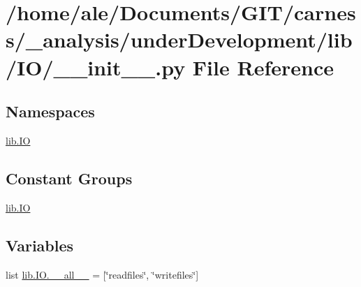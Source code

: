 \hypertarget{a00046}{\section{/home/ale/\-Documents/\-G\-I\-T/carness/\-\_\-analysis/under\-Development/lib/\-I\-O/\-\_\-\-\_\-init\-\_\-\-\_\-.py File Reference}
\label{a00046}
}
\subsection*{Namespaces}
\begin{DoxyCompactItemize}
\item 
\hyperlink{a00108}{lib.\-I\-O}
\end{DoxyCompactItemize}
\subsection*{Constant Groups}
\begin{DoxyCompactItemize}
\item 
\hyperlink{a00108}{lib.\-I\-O}
\end{DoxyCompactItemize}
\subsection*{Variables}
\begin{DoxyCompactItemize}
\item 
list \hyperlink{a00108_ad1c2e5e5a0c13974253993ecd0f01d5c}{lib.\-I\-O.\-\_\-\-\_\-all\-\_\-\-\_\-} = \mbox{[}\char`\"{}readfiles\char`\"{}, \char`\"{}writefiles\char`\"{}\mbox{]}
\end{DoxyCompactItemize}
